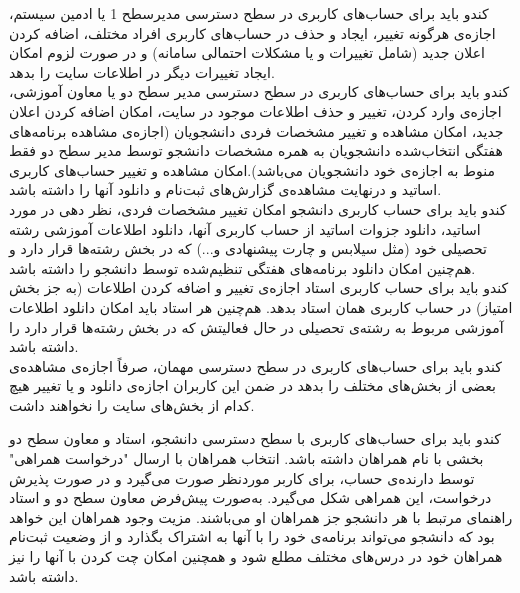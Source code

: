 \documentclass{report}
\begin{document}
\begin{adjustwidth}{2em}{0pt}
           کندو باید برای حساب‌های کاربری در سطح دسترسی مدیرسطح 1 یا ادمین سیستم، اجازه‌ی هرگونه تغییر، ایجاد و حذف در حساب‌های کاربری افراد مختلف، اضافه کردن اعلان جدید (شامل تغییرات و یا مشکلات احتمالی سامانه) و در صورت لزوم امکان ایجاد تغییرات دیگر در اطلاعات سایت را بدهد.     
\\
        کندو باید برای حساب‌های کاربری در سطح دسترسی مدیر سطح دو یا معاون آموزشی، اجازه‌ی وارد کردن، تغییر و حذف اطلاعات موجود در سایت، امکان اضافه کردن اعلان جدید، امکان مشاهده و تغییر مشخصات فردی دانشجویان (اجازه‌ی مشاهده برنامه‌های هفتگی انتخاب‌شده دانشجویان به همره مشخصات دانشجو توسط مدیر سطح دو فقط منوط به اجازه‌ی خود دانشجویان می‌باشد).امکان مشاهده و تغییر حساب‌های کاربری اساتید و درنهایت مشاهده‌ی گزارش‌های ثبت‌نام و دانلود آنها را داشته باشد.     
\\     
    کندو باید برای حساب کاربری دانشجو امکان تغییر مشخصات فردی، نظر دهی در مورد اساتید، دانلود جزوات اساتید از حساب کاربری آنها، دانلود اطلاعات آموزشی رشته تحصیلی خود (مثل سیلابس و چارت پیشنهادی و...) که در بخش رشته‌ها قرار دارد و هم‌چنین امکان دانلود برنامه‌های هفتگی تنظیم‌شده توسط دانشجو را داشته باشد.
\\
        کندو باید برای حساب کاربری استاد اجازه‌ی تغییر و اضافه کردن اطلاعات (به جز بخش امتیاز) در حساب کاربری همان استاد بدهد. هم‌چنین هر استاد باید امکان دانلود اطلاعات آموزشی مربوط به رشته‌ی تحصیلی در حال فعالیتش که در بخش رشته‌ها قرار دارد را داشته باشد.
\\
        کندو باید برای حساب‌های کاربری در سطح دسترسی مهمان، صرفاً اجازه‌ی مشاهده‌ی بعضی از بخش‌های مختلف را بدهد در ضمن این کاربران اجازه‌ی دانلود و یا تغییر هیچ کدام از بخش‌های سایت را نخواهند داشت.
                                                                                                                                     \end{adjustwidth}                                                                                                                                                                                                                        
                                                                                                                                                                                                                          کندو باید برای حساب‌های کاربری با سطح دسترسی دانشجو، استاد و معاون سطح دو بخشی با نام همراهان داشته باشد. انتخاب همراهان با ارسال  "درخواست همراهی"  توسط دارنده‌ی حساب، برای کاربر موردنظر صورت می‌گیرد و در صورت پذیرش درخواست، این همراهی شکل می‌گیرد. به‌صورت پیش‌فرض معاون سطح دو و استاد راهنمای مرتبط با هر دانشجو جز همراهان او می‌باشند. مزیت وجود همراهان این خواهد بود که دانشجو می‌تواند برنامه‌ی خود را با آنها به اشتراک بگذارد و از وضعیت ثبت‌نام همراهان خود در درس‌های مختلف مطلع شود و همچنین امکان چت کردن با آنها را نیز داشته باشد.
\end{document}
